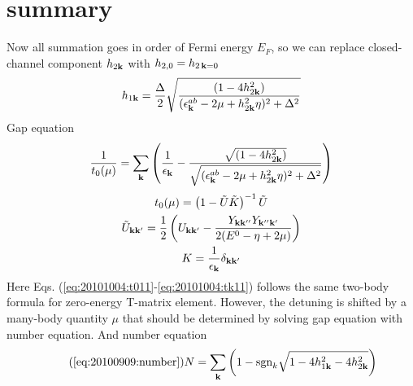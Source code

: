 \section{summary}
Now all summation goes in order of Fermi energy $E_F$, so we can replace closed-channel component $h_{2\mathbf{k}}$ with $h_{2,0}=h_{2\,\mathbf{k}=0}$
\begin{equation}
h_{1\mathbf{k}}=\frac{\Delta}2\sqrt{\frac{(1-4h_{2\mathbf{k}}^{2})}{(\epsilon^{ab}_{\mathbf{k}}-2\mu+  h_{2\mathbf{k}}^2\eta)^{2}+\Delta^{2}}}
\end{equation}
Gap equation 
\begin{equation}\label{eq:20101004:gapS}
\frac{1}{{t_{0}}(\mu)}=\sum_{\mathbf{k}}
\left(\frac{1}{\epsilon_{\mathbf{k}}}-\frac{\sqrt{(1-4h_{2\mathbf{k}}^{2})}}{\sqrt{{(\epsilon^{ab}_{\mathbf{k}}-2\mu+  h_{2\mathbf{k}}^2\eta)^{2}+\Delta^{2}}}}\right)
\end{equation} 
\begin{gather}
{t_{0}}(\mu)=\left(1-\tilde{U}\tilde{ K}\right)^{-1}\tilde{U}\label{eq:20101004:t011}\\
\tilde{U}_{\mathbf{k}\mathbf{k}'}=\frac{1}{2} \left(U_{\mathbf{k}\mathbf{k}'}-\frac{Y_{\mathbf{k}\mathbf{k}''}Y_{\mathbf{k}''\mathbf{k}'}}{2(E^{0}-\eta+2\mu)}\right)\label{eq:20101004:tu11}\\
{K}=\frac{1}{\epsilon_{\mathbf{k}}}\delta_{\mathbf{k}\mathbf{k}'}\label{eq:20101004:tk11}
\end{gather}
Here Eqs. (\ref{eq:20101004:t011}-\ref{eq:20101004:tk11}) follows the same two-body formula for zero-energy T-matrix element.  However, the detuning is shifted by a many-body quantity $\mu$ that should be determined by solving gap equation with number equation.  
And number equation
\begin{equation}\tag{\ref{eq:20100909:number}}
N=\sum_{\vk} \left(1-\sgn_{k}\sqrt{1-4 h_{1\vk}^2-4 h_{2\vk}^2}\right)
\end{equation} 

